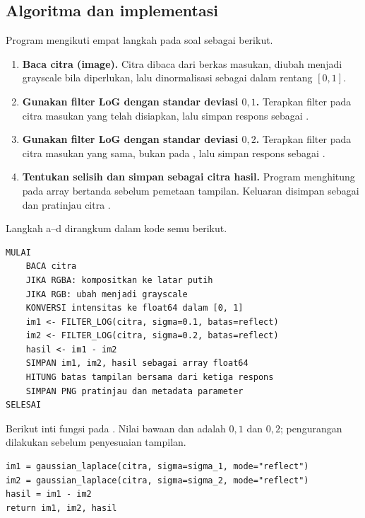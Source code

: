 \clearpage
\subsection{Algoritma dan implementasi}

Program mengikuti empat langkah pada soal sebagai berikut.
\begin{enumerate}[label=\alph*.,leftmargin=*,itemsep=2pt]
\item \textbf{Baca citra (image).} Citra dibaca dari berkas masukan,
diubah menjadi grayscale bila diperlukan, lalu dinormalisasi sebagai
 dalam rentang $[0,1]$.
\item \textbf{Gunakan filter LoG dengan standar deviasi $0{,}1$.}
Terapkan filter pada citra masukan yang telah disiapkan, lalu simpan
respons sebagai .
\item \textbf{Gunakan filter LoG dengan standar deviasi $0{,}2$.}
Terapkan filter pada citra masukan yang sama, bukan pada ,
lalu simpan respons sebagai .
\item \textbf{Tentukan selisih dan simpan sebagai citra hasil.}
Program menghitung  pada array 
bertanda sebelum pemetaan tampilan. Keluaran disimpan sebagai
 dan pratinjau citra .
\end{enumerate}

Langkah a--d dirangkum dalam kode semu berikut.

\noindent\begin{minipage}{\textwidth}
\begin{lstlisting}[style=pseudocode,caption={Kode semu penyelesaian nomor 1.}]
MULAI
    BACA citra
    JIKA RGBA: kompositkan ke latar putih
    JIKA RGB: ubah menjadi grayscale
    KONVERSI intensitas ke float64 dalam [0, 1]
    im1 <- FILTER_LOG(citra, sigma=0.1, batas=reflect)
    im2 <- FILTER_LOG(citra, sigma=0.2, batas=reflect)
    hasil <- im1 - im2
    SIMPAN im1, im2, hasil sebagai array float64
    HITUNG batas tampilan bersama dari ketiga respons
    SIMPAN PNG pratinjau dan metadata parameter
SELESAI
\end{lstlisting}
\end{minipage}

Berikut inti fungsi  pada .
Nilai bawaan  dan  adalah $0{,}1$ dan $0{,}2$;
pengurangan dilakukan sebelum penyesuaian tampilan.

\noindent\begin{minipage}{\textwidth}
\begin{lstlisting}[style=pythoncode,caption={Perhitungan kedua respons dan selisihnya.}]
im1 = gaussian_laplace(citra, sigma=sigma_1, mode="reflect")
im2 = gaussian_laplace(citra, sigma=sigma_2, mode="reflect")
hasil = im1 - im2
return im1, im2, hasil
\end{lstlisting}
\end{minipage}

